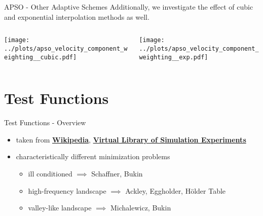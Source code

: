 \documentclass[11pt,aspectratio=169]{beamer}
\begin{document}
\begin{frame}[fragile]{APSO - Other Adaptive Schemes}
    Additionally, we investigate the effect of cubic and exponential interpolation methods as well.
    \smallskip
    \begin{columns}
    \begin{column}{0.4\textwidth}
        \texttt{[image: ../plots/apso\_velocity\_component\_weighting\_\_cubic.pdf]}
    \end{column}

    \begin{column}{0.4\textwidth}
        \texttt{[image: ../plots/apso\_velocity\_component\_weighting\_\_exp.pdf]}
    \end{column}
    \end{columns}
\end{frame}

%
%

\section{Test Functions}

%
%

\begin{frame}[fragile]{Test Functions - Overview}
    \begin{itemize}
        \item taken from \href{https://en.wikipedia.org/wiki/Test_functions_for_optimization}{\textbf{Wikipedia}}, 
            \href{https://www.sfu.ca/~ssurjano/michal.html}{\textbf{Virtual Library of Simulation Experiments}}
        \item characteristically different minimization problems
            \begin{itemize}
                \item ill conditioned $\implies$ Schaffner, Bukin
                \item high-frequency landscape $\implies$ Ackley, Eggholder, H\"older Table
                \item valley-like landscape $\implies$ Michalewicz, Bukin
            \end{itemize}

    \end{itemize}
\end{frame}
\end{document}
